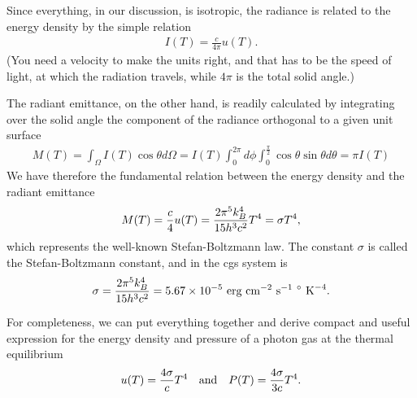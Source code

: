 Since everything, in our discussion, is isotropic, the radiance is related to the
energy density by the simple relation
\begin{align}
  I(T) = \frac{c}{4\pi} u(T).
\end{align}
(You need a velocity to make the units right, and that has to be the speed of light,
at which the radiation travels, while $4\pi$ is the total solid angle.)

The radiant emittance, on the other hand, is readily calculated by integrating over
the solid angle the component of the radiance orthogonal to a given unit surface
\begin{align*}
  M(T) = \int_\Omega I(T) \cos\theta d\Omega =
  I(T) \int_0^{2\pi} d\phi \int_0^{\frac{\pi}{2}} \cos\theta \sin\theta d\theta = \pi I (T)
\end{align*}
We have therefore the fundamental relation between the energy density and the
radiant emittance
\begin{align}
  M(T) = \frac{c}{4} u(T) =
  \frac{2\pi^5 k_B^4}{15 h^3 c^2} T^4 = \sigma T^4,
\end{align}
which represents the well-known Stefan-Boltzmann law. The constant $\sigma$ is called the
Stefan-Boltzmann constant, and in the cgs system is
\begin{align*}
  \sigma = \frac{2\pi^5 k_B^4}{15 h^3 c^2} =
    5.67 \times 10^{-5}~\text{erg}~\text{cm}^{-2}~\text{s}^{-1}~^\circ~\text{K}^{-4}.
\end{align*}

For completeness, we can put everything together and derive compact and useful
expression for the energy density and pressure of a photon gas at the thermal
equilibrium
\begin{align}
  u(T) = \frac{4\sigma}{c} T^4 \quad\text{and}\quad P(T) = \frac{4\sigma}{3c} T^4.
\end{align}
